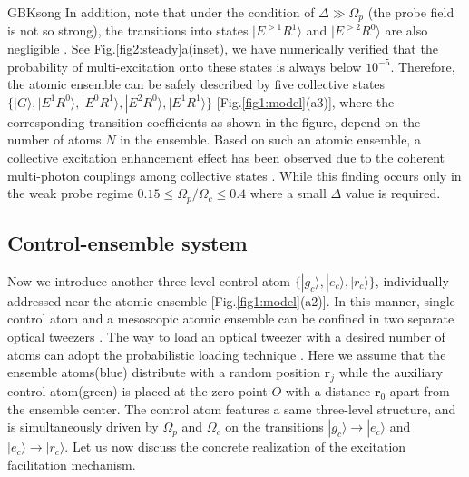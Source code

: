 \documentclass{cpbtex}
\begin{document}
\begin{CJK*}{GBK}{song}
In addition, note that under the condition of $\Delta\gg\Omega_p$ (the probe field is not so strong), 
the transitions into
states $|E^{> 1}R^1\rangle$ and $|E^{> 2}R^0\rangle$ are also negligible \cite{PhysRevA.86.023828}. See Fig.\ref{fig2:steady}a(inset),
we have
numerically verified that the probability of multi-excitation onto these states is always below $10^{-5}$. Therefore, the atomic ensemble can be safely described by five collective states $\{|G\rangle ,|E^{1}R^{0}\rangle, |E^{0}R^{1}\rangle, |E^{2}R^{0}\rangle, |E^{1}R^{1}\rangle\}$ [Fig.\ref{fig1:model}(a3)], where the corresponding transition coefficients
as shown in the figure, depend on the number of 
atoms $N$ in the ensemble. Based on such an atomic ensemble, a collective excitation enhancement effect has been observed due to the coherent multi-photon couplings among collective states \cite{PhysRevLett.113.233002}. While this finding occurs only in the weak probe regime $0.15\leq\Omega_p/\Omega_c\leq0.4$ where a small $\Delta$ value is required.

\subsection{Control-ensemble system}





Now we introduce another three-level  control atom $\{|g_c
\rangle,|e_c\rangle,|r_c\rangle \}$, individually addressed near the atomic ensemble [Fig.\ref{fig1:model}(a2)]. 
In this manner, single control atom and a mesoscopic atomic ensemble can be confined in two separate 
optical tweezers \cite{doi:10.1080/23746149.2022.2064231}. The way to load an optical tweezer with a desired number of atoms can adopt the probabilistic loading technique \cite{PhysRevLett.96.063001}. Here we assume that the ensemble atoms(blue) distribute with a random position $\bm{r}_j$ while the auxiliary control atom(green) is placed at the zero point $O$ with a distance $\bm{r}_0$ apart from the ensemble center. The control atom features a same three-level structure, and is simultaneously driven by $\Omega_p$ and $\Omega_c$ on the transitions  $|g_c\rangle\to|e_c\rangle$ and $|e_c\rangle\to|r_c\rangle$. Let us now discuss the concrete realization of the excitation facilitation mechanism. 




\end{CJK*}
\end{document}
